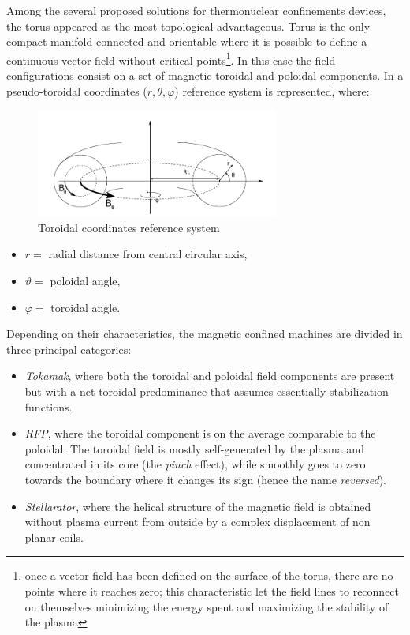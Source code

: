 Among the several proposed solutions for thermonuclear confinements devices, the torus appeared as the most topological advantageous. Torus is the only compact manifold connected and orientable where it is possible to define a continuous vector field without critical points\footnote{once a vector field has been defined on the surface of the torus, there are no points where it reaches zero; this characteristic let the field lines to reconnect on themselves minimizing the energy spent and maximizing the stability of the plasma}.
In this case the field configurations consist on a set of magnetic toroidal and poloidal components. In \Figure{\ref{fig:intro_toroidal_coords}} a pseudo-toroidal coordinates ($r,\theta,\varphi$) reference system is represented, where:
\begin{figure}[h!]
    \centering
    \includegraphics[width=8cm]{img/1_intro/toroidal_coords.png}
    \caption{Toroidal coordinates reference system}
    \label{fig:intro_toroidal_coords}
\end{figure}
\begin{itemize}
    \item $r = $ radial distance from central circular axis,
    \item $\vartheta = $ poloidal angle,
    \item $\varphi = $ toroidal angle.
\end{itemize}
Depending on their characteristics, the magnetic confined machines are divided in three principal categories:
\begin{itemize}
    \item \textit{Tokamak}, where both the toroidal and poloidal field components are present but with a net toroidal predominance that assumes essentially stabilization functions.
    \item \textit{RFP}, where the toroidal component is on the average comparable to the poloidal. The toroidal field is mostly self-generated by the plasma and concentrated in its core (the \emph{pinch} effect), while smoothly goes to zero towards the boundary where it changes its sign (hence the name \textit{reversed}). %
    \item \textit{Stellarator}, where the helical structure of the magnetic field is obtained without plasma current from outside by a complex displacement of non planar coils.
\end{itemize}

